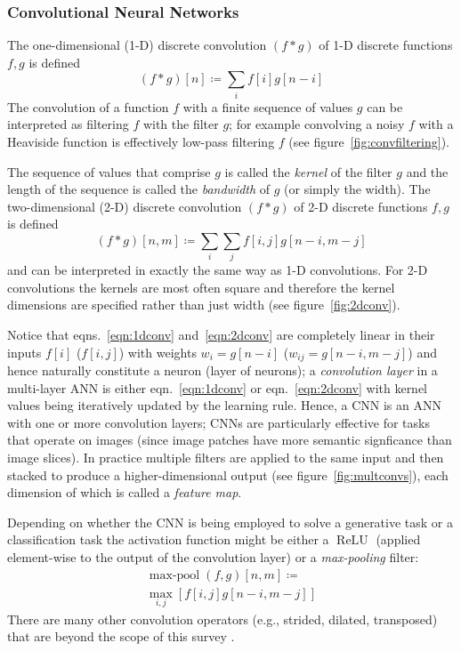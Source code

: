 \subsubsection{Convolutional Neural Networks}
The one-dimensional (1-D) discrete convolution \((f*g)\) of 1-D discrete functions \(f,g\) is defined
\begin{equation}
    (f*g)[n]\coloneqq \sum _{i} f[i]g[n-i]
    \label{eqn:1dconv}
\end{equation}
The convolution of a function \(f\) with a finite sequence of values \(g\) can be interpreted as filtering \(f\) with the filter \(g\); for example convolving a noisy \(f\) with a Heaviside function is effectively low-pass filtering \(f\) (see figure~\ref{fig:convfiltering}).

%
The sequence of values that comprise \(g\) is called the \textit{kernel} of the filter \(g\) and the length of the sequence is called the \textit{bandwidth} of \(g\) (or simply the width).
%
The two-dimensional (2-D) discrete convolution \((f*g)\) of 2-D discrete functions \(f,g\) is defined
\begin{equation}
    (f*g)[n, m]\coloneqq \sum _{i}\sum _{j}f[i, j]g[n-i, m-j]
    \label{eqn:2dconv}
\end{equation}
and can be interpreted in exactly the same way as 1-D convolutions.
%
For 2-D convolutions the kernels are most often square and therefore the kernel dimensions are specified rather than just width (see figure~\ref{fig:2dconv}).


Notice that eqns.~\eqref{eqn:1dconv} and~\eqref{eqn:2dconv} are completely linear in their inputs \(f[i]\) (\(f[i,j]\)) with weights \(w_i = g[n-i]\) (\(w_{ij} = g[n-i, m-j]\)) and hence naturally constitute a neuron (layer of neurons); a \textit{convolution layer} in a multi-layer ANN is either eqn.~\eqref{eqn:1dconv} or eqn.~\eqref{eqn:2dconv} with kernel values being iteratively updated by the learning rule.
%
Hence, a CNN is an ANN with one or more convolution layers; CNNs are particularly effective for tasks that operate on images (since image patches have more semantic signficance than image slices).
%
In practice multiple filters are applied to the same input and then stacked to produce a higher-dimensional output (see figure~\ref{fig:multconvs}), each dimension of which is called a \textit{feature map}.

%
Depending on whether the CNN is being employed to solve a generative task or a classification task the activation function might be either a \(\operatorname{ReLU}\) (applied element-wise to the output of the convolution layer) or a \textit{max-pooling} filter:
\begin{multline}
    \operatorname{max-pool}(f,g)[n, m]\coloneqq\\ \max_{i,j}\left[ f[i, j]g[n-i, m-j] \right]
    \label{eqn:2dpool}
\end{multline}
There are many other convolution operators (e.g., strided, dilated, transposed) that are beyond the scope of this survey \cite{dumoulin2016guide}.

